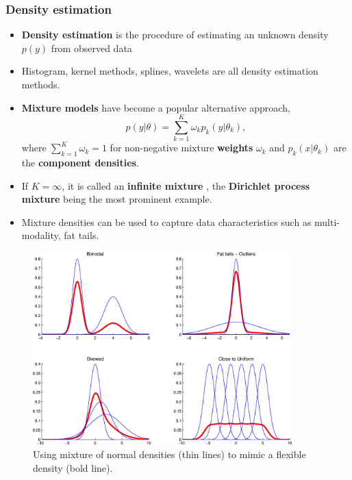 \documentclass[10pt]{beamer}
\begin{document}
\begin{frame}
  \frametitle{Density estimation}
  \begin{itemize}
  \item \textbf{Density estimation} is the procedure of estimating an unknown density
    $p(y)$ from observed data

  \item Histogram, kernel methods, splines, wavelets are all density estimation
    methods.

  \item \textbf{Mixture models} \citep{jiang1999approximation} have become a popular alternative approach,
    \[
    p(y|\theta)=\sum\limits _{k=1}^{K}\omega_{k}p_{k}(y|\theta_{k}),
    \]
    where $\sum\nolimits _{k=1}^{K}\omega_{k}=1$ for non-negative mixture
    \textbf{weights} $\omega_{k}$ and $p_{k}(x|\theta_{k})$ are the \textbf{
      component densities}.

  \item If $K=\infty$, it is called an \textbf{infinite mixture} \citep{escobar1994estimating}, the
    \textbf{Dirichlet process mixture} being the most prominent example.

  \item Mixture densities can be used to capture data characteristics such as
    multi-modality, fat tails.

  \end{itemize}

\end{frame}


\begin{frame}
  \begin{figure}
\centering
\includegraphics[width=10cm]{MixtureOfNormals2}\caption{Using mixture of normal
  densities (thin lines) to mimic a flexible density (bold line).}
\label{fig: mix-norm}
\end{figure}
\end{frame}
\end{document}
